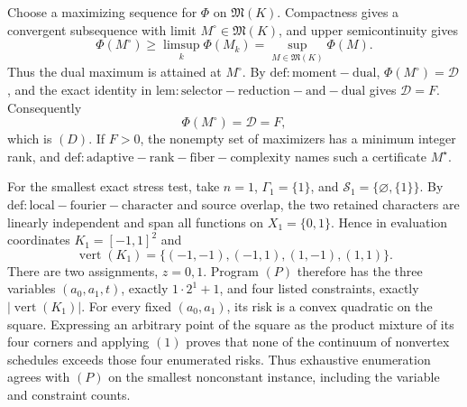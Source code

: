 Choose a maximizing sequence for \(\Phi\) on \(\mathfrak M(K)\). Compactness gives a convergent subsequence with limit \(M^{\circ}\in\mathfrak M(K)\), and upper semicontinuity gives
\[
\Phi(M^{\circ})\ge\limsup_k\Phi(M_k)
=\sup_{M\in\mathfrak M(K)}\Phi(M).
\]
Thus the dual maximum is attained at \(M^{\circ}\). By \(\mathrm{def:moment-dual}\), \(\Phi(M^{\circ})=\mathcal D\), and the exact identity in \(\mathrm{lem:selector-reduction-and-dual}\) gives \(\mathcal D=F\). Consequently
\[
\Phi(M^{\circ})=\mathcal D=F,
\]
which is \((D)\). If \(F>0\), the nonempty set of maximizers has a minimum integer rank, and \(\mathrm{def:adaptive-rank-fiber-complexity}\) names such a certificate \(M^{\star}\).

For the smallest exact stress test, take \(n=1\), \(\Gamma_1=\{1\}\), and \(\mathcal S_1=\{\varnothing,\{1\}\}\). By \(\mathrm{def:local-fourier-character}\) and source overlap, the two retained characters are linearly independent and span all functions on \(X_1=\{0,1\}\). Hence in evaluation coordinates \(K_1=[-1,1]^2\) and
\[
\operatorname{vert}(K_1)=\{(-1,-1),(-1,1),(1,-1),(1,1)\}.
\]
There are two assignments, \(z=0,1\). Program \((P)\) therefore has the three variables \((a_0,a_1,t)\), exactly \(1\cdot2^1+1\), and four listed constraints, exactly \(\lvert\operatorname{vert}(K_1)\rvert\). For every fixed \((a_0,a_1)\), its risk is a convex quadratic on the square. Expressing an arbitrary point of the square as the product mixture of its four corners and applying \((1)\) proves that none of the continuum of nonvertex schedules exceeds those four enumerated risks. Thus exhaustive enumeration agrees with \((P)\) on the smallest nonconstant instance, including the variable and constraint counts.
